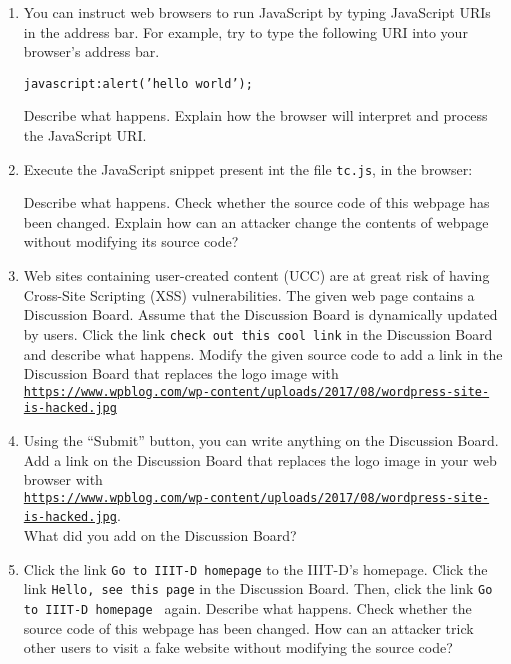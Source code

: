 \documentclass[11pt]{article}
\begin{document}
\begin{enumerate}
\item {
You can instruct web browsers to run JavaScript by typing JavaScript URIs in the address bar. For example, try to type the following URI into your browser’s address bar.  

\texttt{javascript:alert('hello world');}

Describe what happens.  Explain how the browser will interpret and process the JavaScript URI.
}

\item {
Execute the JavaScript snippet present int the file \texttt{tc.js}, in the browser:

Describe what happens.  Check whether the source code of this webpage has been changed. 
Explain how can an attacker change the contents of webpage without modifying its source code?


}

\item {
Web sites containing user-created content (UCC) are at great risk of having Cross-Site Scripting (XSS) vulnerabilities. The given web page contains a Discussion Board. Assume that the Discussion Board is dynamically updated by users. Click the link \texttt{check out this cool link} in the Discussion Board and describe what happens. 
Modify the given source code to add a link in the Discussion Board that replaces the logo image with\\\href{https://www.wpblog.com/wp-content/uploads/2017/08/wordpress-site-is-hacked.jpg}{ \texttt{https://www.wpblog.com/wp-content/uploads/2017/08/wordpress-site-is-hacked.jpg}}

}

\item {
Using the “Submit” button, you can write anything on the Discussion Board. 
Add a link on the Discussion Board that replaces the logo image in your web browser with \\ \href{https://www.wpblog.com/wp-content/uploads/2017/08/wordpress-site-is-hacked.jpg}{\texttt{https://www.wpblog.com/wp-content/uploads/2017/08/wordpress-site-is-hacked.jpg}}.\\
What did you add on the Discussion Board?

}

\item {
Click the link \texttt{Go to IIIT-D homepage} to the IIIT-D’s homepage. Click the link \texttt{Hello, see this page} in the Discussion Board. Then, click the link \texttt{Go to IIIT-D homepage } again. Describe what happens. Check whether the source code of this webpage has been changed. How can an attacker trick other users to visit a fake website without modifying the source code?

}
\end{enumerate}
\end{document}
